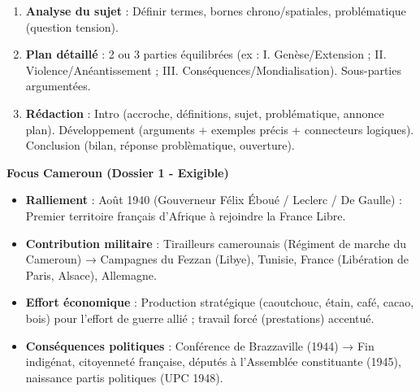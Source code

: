 \documentclass[11pt]{article}
\begin{document}
\begin{bilan}
\begin{methode}
\begin{enumerate}
    \item \textbf{Analyse du sujet} : Définir termes, bornes chrono/spatiales, problématique (question tension).
    \item \textbf{Plan détaillé} : 2 ou 3 parties équilibrées (ex : I. Genèse/Extension ; II. Violence/Anéantissement ; III. Conséquences/Mondialisation). Sous-parties argumentées.
    \item \textbf{Rédaction} : Intro (accroche, définitions, sujet, problématique, annonce plan). Développement (arguments + exemples précis + connecteurs logiques). Conclusion (bilan, réponse problèmatique, ouverture).
\end{enumerate}
\end{methode}

\textbf{Focus Cameroun (Dossier 1 - Exigible)}
\begin{itemize}
    \item \textbf{Ralliement} : Août 1940 (Gouverneur Félix Éboué / Leclerc / De Gaulle) : Premier territoire français d'Afrique à rejoindre la France Libre.
    \item \textbf{Contribution militaire} : Tirailleurs camerounais (Régiment de marche du Cameroun) → Campagnes du Fezzan (Libye), Tunisie, France (Libération de Paris, Alsace), Allemagne.
    \item \textbf{Effort économique} : Production stratégique (caoutchouc, étain, café, cacao, bois) pour l'effort de guerre allié ; travail forcé (prestations) accentué.
    \item \textbf{Conséquences politiques} : Conférence de Brazzaville (1944) → Fin indigénat, citoyenneté française, députés à l'Assemblée constituante (1945), naissance partis politiques (UPC 1948).
\end{itemize}

\end{bilan}
\end{document}
